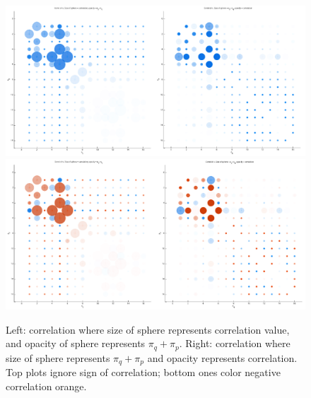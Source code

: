\documentclass[12pt]{amsart}
\begin{document}
\begin{figure}
	\caption{Left: correlation where size of sphere represents correlation value, and opacity of sphere represents $\pi_q+\pi_p$. Right: correlation where size of sphere represents $\pi_q+\pi_p$ and opacity represents correlation. Top plots ignore sign of correlation; bottom ones color negative correlation orange.}
	\begin{center}
		\includegraphics[scale=.75]{correlation_3.pdf}
		\includegraphics[scale=.75]{correlation_colors_3.pdf}
	\end{center}
\end{figure}
\end{document}
